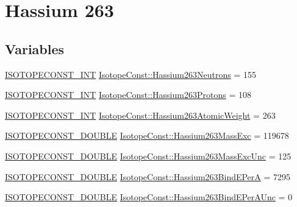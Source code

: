 \hypertarget{group___isotope_const-_hassium-_hs263}{}\section{Hassium 263}
\label{group___isotope_const-_hassium-_hs263}
\subsection*{Variables}
\begin{DoxyCompactItemize}
\item 
\mbox{\hyperlink{group___isotope_const-_macros_ga5f18360b3e99483a35c32d789e62621c}{I\+S\+O\+T\+O\+P\+E\+C\+O\+N\+S\+T\+\_\+\+I\+NT}} \mbox{\hyperlink{group___isotope_const-_hassium-_hs263_gaaa8dd99dc61436666c6d061ff1b5f5b8}{Isotope\+Const\+::\+Hassium263\+Neutrons}} = 155
\item 
\mbox{\hyperlink{group___isotope_const-_macros_ga5f18360b3e99483a35c32d789e62621c}{I\+S\+O\+T\+O\+P\+E\+C\+O\+N\+S\+T\+\_\+\+I\+NT}} \mbox{\hyperlink{group___isotope_const-_hassium-_hs263_ga10b442847f8d6d9eba149ddcf11df8d7}{Isotope\+Const\+::\+Hassium263\+Protons}} = 108
\item 
\mbox{\hyperlink{group___isotope_const-_macros_ga5f18360b3e99483a35c32d789e62621c}{I\+S\+O\+T\+O\+P\+E\+C\+O\+N\+S\+T\+\_\+\+I\+NT}} \mbox{\hyperlink{group___isotope_const-_hassium-_hs263_gac920c60c54a60b03f1fa71af5a99dd31}{Isotope\+Const\+::\+Hassium263\+Atomic\+Weight}} = 263
\item 
\mbox{\hyperlink{group___isotope_const-_macros_ga8f45a7272ce02c0b4c65c44636ed719a}{I\+S\+O\+T\+O\+P\+E\+C\+O\+N\+S\+T\+\_\+\+D\+O\+U\+B\+LE}} \mbox{\hyperlink{group___isotope_const-_hassium-_hs263_ga5c9b57feb1f4cb9593cb55f68d8af148}{Isotope\+Const\+::\+Hassium263\+Mass\+Exc}} = 119678
\item 
\mbox{\hyperlink{group___isotope_const-_macros_ga8f45a7272ce02c0b4c65c44636ed719a}{I\+S\+O\+T\+O\+P\+E\+C\+O\+N\+S\+T\+\_\+\+D\+O\+U\+B\+LE}} \mbox{\hyperlink{group___isotope_const-_hassium-_hs263_ga3691aed8879413b523f66595272fd6b4}{Isotope\+Const\+::\+Hassium263\+Mass\+Exc\+Unc}} = 125
\item 
\mbox{\hyperlink{group___isotope_const-_macros_ga8f45a7272ce02c0b4c65c44636ed719a}{I\+S\+O\+T\+O\+P\+E\+C\+O\+N\+S\+T\+\_\+\+D\+O\+U\+B\+LE}} \mbox{\hyperlink{group___isotope_const-_hassium-_hs263_ga953e90d1d2ffac58fabc3e985657861c}{Isotope\+Const\+::\+Hassium263\+Bind\+E\+PerA}} = 7295
\item 
\mbox{\hyperlink{group___isotope_const-_macros_ga8f45a7272ce02c0b4c65c44636ed719a}{I\+S\+O\+T\+O\+P\+E\+C\+O\+N\+S\+T\+\_\+\+D\+O\+U\+B\+LE}} \mbox{\hyperlink{group___isotope_const-_hassium-_hs263_ga57c004258900b6806e74571543a82c1e}{Isotope\+Const\+::\+Hassium263\+Bind\+E\+Per\+A\+Unc}} = 0

\end{DoxyCompactItemize}
